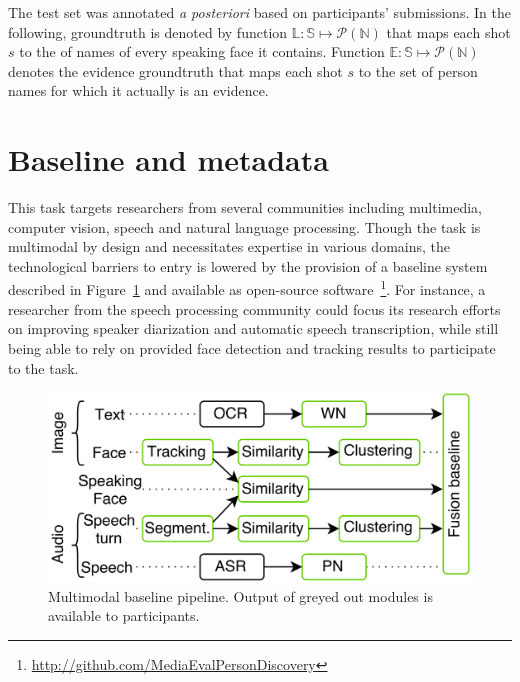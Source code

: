 \documentclass{acm_proc_article-me}
\newcommand\refEvidences{\mathbb{E}}
\newcommand\refLabels{\mathbb{L}}
\newcommand\refNames{\mathbb{N}}
\newcommand\shots{\mathbb{S}}
\begin{document}
The test set was annotated \emph{a posteriori} based on participants' submissions. In the following, groundtruth is denoted by function $\refLabels : \shots \mapsto \mathcal{P}(\refNames)$ that maps each shot $s$ to the of names of every speaking face it contains. Function $\refEvidences : \shots \mapsto \mathcal{P}(\refNames)$ denotes the evidence groundtruth that maps each shot $s$ to the set of person names for which it actually is an evidence.

\section{Baseline and metadata}

This task targets researchers from several communities including multimedia, computer vision, speech and natural language processing. Though the task is multimodal by design and necessitates expertise in various domains, the technological barriers to entry is lowered by the provision of a baseline system described in Figure~\ref{fig:baseline} and available as open-source software~\footnote{\url{http://github.com/MediaEvalPersonDiscovery}}.
For instance, a researcher from the speech processing community could focus its research efforts on improving speaker diarization and automatic speech transcription, while still being able to rely on provided face detection and tracking results to participate to the task.

\begin{figure}[htb]
 \center
 \includegraphics[width=1\linewidth]{figs/baseline.png}
 \centering
 \caption {Multimodal baseline pipeline. Output of greyed out modules is available to participants.}
 \label{fig:baseline}
\end{figure}

\end{document}
